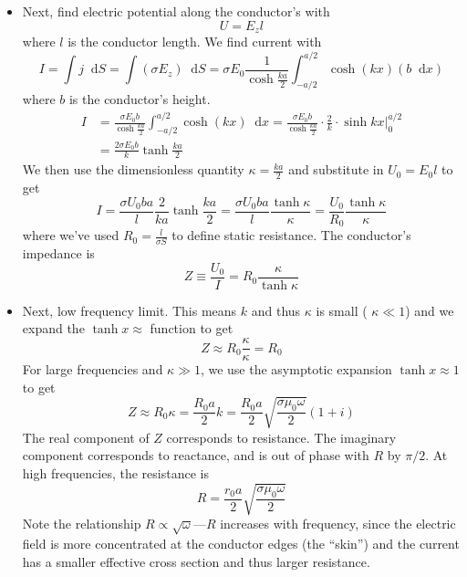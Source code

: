 \documentclass[11pt, a4paper]{article}
\newcommand{\diff}{\mathop{}\!\mathrm{d}} %
\renewcommand{\vec}[1]{\bm{#1}} %
\newcommand{\mm}{\mu_{0}}  %
\newcommand{\m}{\vec{m}}  %
\begin{document}
\begin{itemize}
	\item Next, find electric potential along the conductor's with
	\begin{equation*}
		U = E_{z} l
	\end{equation*}
	where $ l $ is the conductor length. We find current with
	\begin{equation*}
		I = \int j \diff S = \int (\sigma E_{z}) \diff S = \sigma E_{0}\frac{1}{\cosh \frac{ka}{2}} \int_{-a/2}^{a/2} \cosh(kx) (b \diff x)
	\end{equation*}
	where $ b $ is the conductor's height. 
	\begin{align*}
		I &= \frac{\sigma E_{0} b}{\cosh \frac{ka}{2}} \int_{-a/2}^{a/2} \cosh(kx) \diff x =  \frac{\sigma E_{0} b}{\cosh \frac{ka}{2}}  \cdot \frac{2}{k} \cdot \sinh kx \bigg |_{0}^{a/2} \\
		& =  \frac{2\sigma E_{0} b}{k} \tanh \frac{ka}{2}
	\end{align*} 
	We then use the dimensionless quantity $ \kappa = \frac{ka}{2} $ and substitute in $ U_{0} = E_{0} l$ to get
	\begin{equation*}
		I = \frac{\sigma U_{0} b a}{l} \frac{2}{ka}\tanh \frac{ka}{2} = \frac{\sigma U_{0} b a}{l} \frac{\tanh \kappa}{\kappa} = \frac{U_{0}}{R_{0}} \frac{\tanh \kappa}{\kappa}
	\end{equation*}
	where we've used $ R_{0} = \frac{l}{\sigma S} $ to define static resistance. The conductor's impedance is
	\begin{equation*}
		Z \equiv \frac{U_{0}}{I} = R_{0}\frac{\kappa}{\tanh \kappa}
	\end{equation*}
	
	\item Next, low frequency limit. This means $ k $ and thus $ \kappa $ is small ( $ \kappa \ll 1 $) and we expand the $ \tanh x \approx  $ function to get
	\begin{equation*}
		Z \approx R_{0} \frac{\kappa}{\kappa} = R_{0}
	\end{equation*}
	For large frequencies and $ \kappa \gg 1 $, we use the asymptotic expansion $ \tanh x \approx 1 $ to get
	\begin{equation*}
		Z \approx R_{0}\kappa = \frac{R_{0}a}{2}k = \frac{R_{0}a}{2} \sqrt{\frac{\sigma \mm \omega}{2}}(1 + i)
	\end{equation*}
	The real component of $ Z $ corresponds to resistance. The imaginary component corresponds to reactance, and is out of phase with $ R $ by $ \pi/2 $. At high frequencies, the resistance is
	\begin{equation*}
		R = \frac{r_{0}a}{2}\sqrt{\frac{\sigma \mm \omega}{2}}
	\end{equation*}
	Note the relationship $ R \propto \sqrt{\omega} $---$ R $ increases with frequency, since the electric field is more concentrated at the conductor edges (the ``skin'') and the current has a smaller effective cross section and thus larger resistance.
	
	
\end{itemize}
\end{document}
